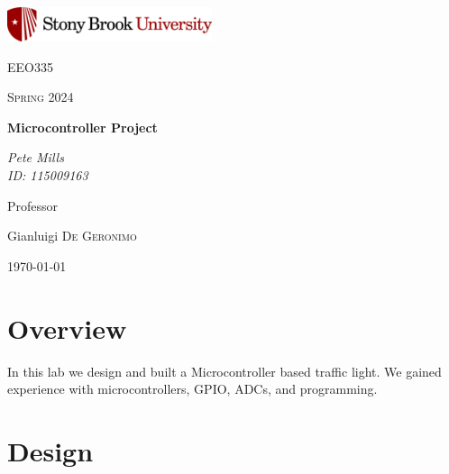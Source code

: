 \documentclass{article}
\begin{document}
	
\begin{titlepage}
	\centering
	\includegraphics[width=0.45\textwidth]{sbu}\par\vspace{1cm}
	{\LARGE \textsc{EEO335}\par}
	\vspace{1cm}
	{\Large \textsc{Spring 2024}\par}
	\vspace{1.5cm}
	{\huge\bfseries Microcontroller Project\par}
	\vspace{2cm}
	{\Large\itshape Pete Mills\\ID: 115009163\par}
	\vfill
	Professor\par
	Gianluigi \textsc{De Geronimo}

	\vfill

	{\large \today\par}
\end{titlepage}

	\newcommand{\assName}{Assignment 8-2.pdf}

	
	
	

	\section*{Overview}
	
	 In this lab we design and built a Microcontroller based traffic light. We gained experience with microcontrollers, GPIO, ADCs, and programming.
	
	\section{Design}
\end{document}
